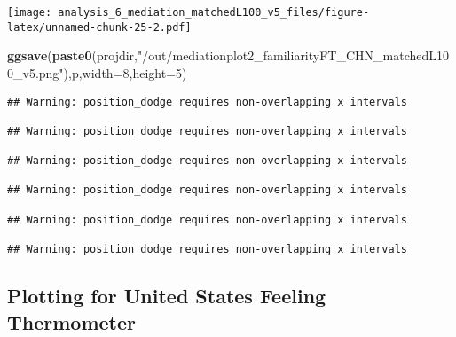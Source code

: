 \documentclass[
]{article}
\newenvironment{Shaded}{\begin{snugshade}}{\end{snugshade}}
\newcommand{\DataTypeTok}[1]{\textcolor[rgb]{0.13,0.29,0.53}{#1}}
\newcommand{\DecValTok}[1]{\textcolor[rgb]{0.00,0.00,0.81}{#1}}
\newcommand{\KeywordTok}[1]{\textcolor[rgb]{0.13,0.29,0.53}{\textbf{#1}}}
\newcommand{\NormalTok}[1]{#1}
\newcommand{\StringTok}[1]{\textcolor[rgb]{0.31,0.60,0.02}{#1}}
\begin{document}
\texttt{[image: analysis\_6\_mediation\_matchedL100\_v5\_files/figure-latex/unnamed-chunk-25-2.pdf]}

\begin{Shaded}
\begin{Highlighting}[]
\KeywordTok{ggsave}\NormalTok{(}\KeywordTok{paste0}\NormalTok{(projdir,}\StringTok{"/out/mediationplot2_familiarityFT_CHN_matchedL100_v5.png"}\NormalTok{),p,}\DataTypeTok{width=}\DecValTok{8}\NormalTok{,}\DataTypeTok{height=}\DecValTok{5}\NormalTok{)}
\end{Highlighting}
\end{Shaded}

\begin{verbatim}
## Warning: position_dodge requires non-overlapping x intervals

## Warning: position_dodge requires non-overlapping x intervals

## Warning: position_dodge requires non-overlapping x intervals

## Warning: position_dodge requires non-overlapping x intervals

## Warning: position_dodge requires non-overlapping x intervals

## Warning: position_dodge requires non-overlapping x intervals
\end{verbatim}

\hypertarget{plotting-for-united-states-feeling-thermometer}{%
\subsection{Plotting for United States Feeling
Thermometer}\label{plotting-for-united-states-feeling-thermometer}}
\end{document}
